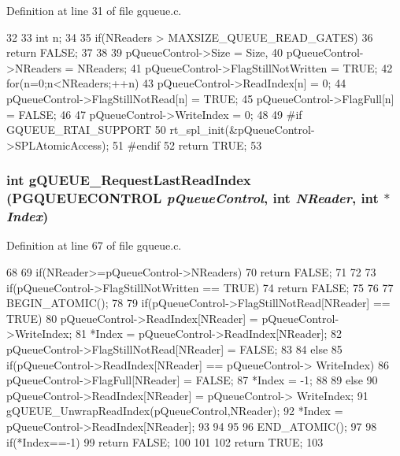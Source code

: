 Definition at line 31 of file gqueue.c.


\begin{DoxyCode}
32 {
33         int n;
34 
35         if(NReaders > MAXSIZE_QUEUE_READ_GATES){
36                 return FALSE;
37         }
38 
39         pQueueControl->Size = Size,
40         pQueueControl->NReaders = NReaders;
41         pQueueControl->FlagStillNotWritten = TRUE;
42         for(n=0;n<NReaders;++n){
43                 pQueueControl->ReadIndex[n] = 0;
44                 pQueueControl->FlagStillNotRead[n] = TRUE;
45                 pQueueControl->FlagFull[n] = FALSE;
46         }
47         pQueueControl->WriteIndex = 0;
48 
49 #if GQUEUE_RTAI_SUPPORT
50         rt_spl_init(&pQueueControl->SPLAtomicAccess);
51 #endif
52     return TRUE;
53 }                      
\end{DoxyCode}
\subsubsection[{gQUEUE\_\-RequestLastReadIndex}]{\setlength{\rightskip}{0pt plus 5cm}int gQUEUE\_\-RequestLastReadIndex ({\bf PGQUEUECONTROL} {\em pQueueControl}, \/  int {\em NReader}, \/  int $\ast$ {\em Index})}\label{gqueue_8c_a61763c54eaa8dd611c81c75745e9b3b2}


Definition at line 67 of file gqueue.c.


\begin{DoxyCode}
68 {
69         if(NReader>=pQueueControl->NReaders){
70                 return FALSE;
71         }
72         
73         if(pQueueControl->FlagStillNotWritten == TRUE){
74                 return FALSE;
75         }
76 
77 BEGIN_ATOMIC();
78         
79         if(pQueueControl->FlagStillNotRead[NReader] == TRUE){
80                 pQueueControl->ReadIndex[NReader] = pQueueControl->WriteIndex;
81                 *Index = pQueueControl->ReadIndex[NReader];
82                 pQueueControl->FlagStillNotRead[NReader] = FALSE;
83         }
84         else{
85                 if(pQueueControl->ReadIndex[NReader] == pQueueControl->
      WriteIndex){
86                         pQueueControl->FlagFull[NReader] = FALSE;       
87                         *Index = -1;
88                 }
89                 else{
90                         pQueueControl->ReadIndex[NReader] = pQueueControl->
      WriteIndex;
91                         gQUEUE_UnwrapReadIndex(pQueueControl,NReader);
92                         *Index = pQueueControl->ReadIndex[NReader];
93                 }
94         }
95 
96 END_ATOMIC();
97 
98         if(*Index==-1){
99                 return FALSE;
100         }  
101 
102     return TRUE;
103 }                      
\end{DoxyCode}
